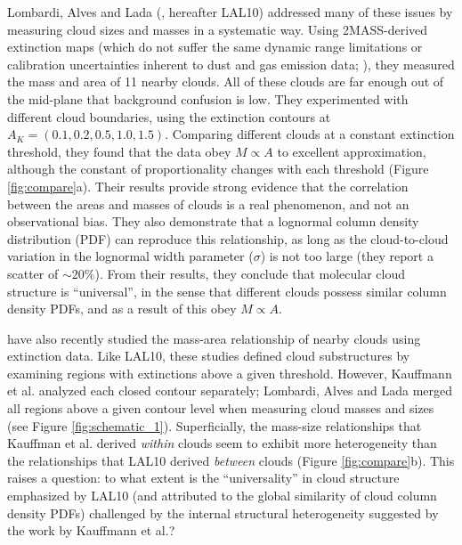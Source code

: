 Lombardi, Alves and Lada (\citeyear{Lombardi10}, hereafter LAL10) addressed many of these issues by measuring cloud sizes and masses in a systematic way. Using 2MASS-derived \citep{2mass} extinction maps (which do not suffer the same dynamic range limitations or calibration uncertainties inherent to dust and gas emission data; \citealt{Goodman09}), they measured the mass and area of 11 nearby clouds. All of these clouds are far enough out of the mid-plane that background confusion is low. They experimented with different cloud boundaries, using the extinction contours at $A_K = (0.1, 0.2, 0.5, 1.0, 1.5)$. Comparing different clouds at a constant extinction threshold, they found that the data obey $M \propto A$ to excellent approximation, although the constant of proportionality changes with each threshold (Figure \ref{fig:compare}a). Their results provide strong evidence that the correlation between the areas and masses of clouds is a real phenomenon, and not an observational bias. They also demonstrate that a lognormal column density distribution (PDF) can reproduce this relationship, as long as the cloud-to-cloud variation in the lognormal width parameter ($\sigma$) is not too large (they report a scatter of $\sim 20\%$). From their results, they conclude that molecular cloud structure is ``universal'', in the sense that different clouds possess similar column density PDFs, and as a result of this obey $M \propto A$.

\cite{Kauffmann10a, Kauffmann10b} have also recently studied the mass-area relationship of nearby clouds using extinction data. Like LAL10, these studies defined cloud substructures by examining regions with extinctions above a given threshold. However, Kauffmann et al. analyzed each closed contour separately; Lombardi, Alves and Lada merged all regions above a given contour level when measuring cloud masses and sizes (see Figure \ref{fig:schematic_1}).  Superficially, the mass-size relationships that Kauffman et al. derived \textit{within} clouds seem to exhibit more heterogeneity than the relationships that LAL10 derived \textit{between} clouds (Figure \ref{fig:compare}b). This raises a question: to what extent is the ``universality'' in cloud structure emphasized by LAL10 (and attributed to the global similarity of cloud column density PDFs) challenged by the internal structural heterogeneity suggested by the work by Kauffmann et al.?


